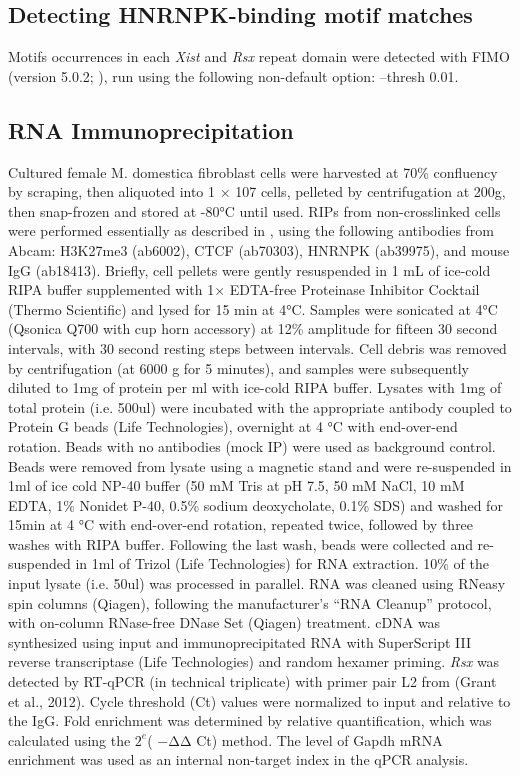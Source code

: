 \subsection{Detecting HNRNPK-binding motif matches}
Motifs occurrences in each \emph{Xist} and \emph{Rsx} repeat domain were detected with FIMO (version 5.0.2; \cite{Bailey2009MEMESearching}), run using the following non-default option: --thresh 0.01.

\subsection{RNA Immunoprecipitation}


Cultured female M. domestica fibroblast cells were harvested at 70\% confluency by scraping, then aliquoted into 1 × 107 cells, pelleted by centrifugation at 200g, then snap-frozen and stored at -80°C until used. RIPs from non-crosslinked cells were performed essentially as described in \cite{Zhao2008PolycombChromosome}, using the following antibodies from Abcam: H3K27me3 (ab6002), CTCF (ab70303), HNRNPK (ab39975), and mouse IgG (ab18413). Briefly, cell pellets were gently resuspended in 1 mL of ice-cold RIPA buffer supplemented with 1× EDTA-free Proteinase Inhibitor Cocktail (Thermo Scientific) and lysed for 15 min at 4°C. Samples were sonicated at 4°C (Qsonica Q700 with cup horn accessory) at 12\% amplitude for fifteen 30 second intervals, with 30 second resting steps between intervals. Cell debris was removed by centrifugation (at 6000 g for 5 minutes), and samples were subsequently diluted to 1mg of protein per ml with ice-cold RIPA buffer. Lysates with 1mg of total protein (i.e. 500ul) were incubated with the appropriate antibody coupled to Protein G beads (Life Technologies), overnight at 4 °C with end-over-end rotation. Beads with no antibodies (mock IP) were used as background control. Beads were removed from lysate using a magnetic stand and were re-suspended in 1ml of ice cold NP-40 buffer (50 mM Tris at pH 7.5, 50 mM NaCl, 10 mM EDTA, 1\% Nonidet P-40, 0.5\% sodium deoxycholate, 0.1\% SDS) and washed for 15min at 4 °C with end-over-end rotation, repeated twice, followed by three washes with RIPA buffer. Following the last wash, beads were collected and re-suspended in 1ml of Trizol (Life Technologies) for RNA extraction. 10\% of the input lysate (i.e. 50ul) was processed in parallel. RNA was cleaned using RNeasy spin columns (Qiagen), following the manufacturer's “RNA Cleanup” protocol, with on-column RNase-free DNase Set (Qiagen) treatment. cDNA was synthesized using input and immunoprecipitated RNA with SuperScript III reverse transcriptase (Life Technologies) and random hexamer priming. \emph{Rsx} was detected by RT-qPCR (in technical triplicate) with primer pair L2 from (Grant et al., 2012). Cycle threshold (Ct) values were normalized to input and relative to the IgG. Fold enrichment was determined by relative quantification, which was calculated using the $2^e$( −ΔΔ Ct) method. The level of Gapdh mRNA enrichment was used as an internal non-target index in the qPCR analysis.

\begin{singlespace}
\printbibliography[heading=bibintoc,title={References}]
\end{singlespace}